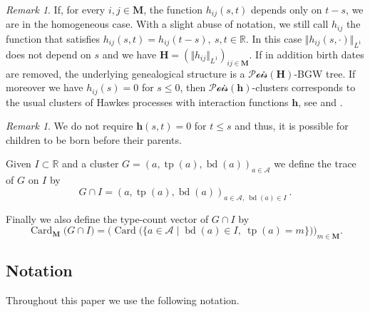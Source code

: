 \documentclass[reqno,final,11pt]{amsart}
\renewcommand{\cite}{\citet}
\theoremstyle{plain}
\theoremstyle{definition}
\theoremstyle{remark}
\newtheorem{remark}[theorem]{Remark}
\newcommand{\R}{\mathds{R}}
\newcommand{\M}{\bm{M}}
\newcommand{\A}{\mathcal{A}}
\newcommand{\h}{\bm{h}}
\renewcommand{\H}{\bm{H}}
\newcommand{\Vone}[1]{\Vert #1 \Vert_{L^1}}
\newcommand{\Pois}{\mathscr{P}\!\mathscr{o}\!\mathscr{i}\!\mathscr{s}}
\DeclareMathOperator{\card}{Card}
\DeclareMathOperator{\tp}{tp}
\DeclareMathOperator{\bd}{bd}
\begin{document}
\begin{remark}
	If, for every $i,j\in\M$, the function $h_{ij}(s,t)$ depends only on $t-s$, we are in the homogeneous case. With a slight abuse of notation, we still call $h_{ij}$ the function that satisfies $h_{ij}(s,t) = h_{ij}(t-s), \ s,t\in\R$. In this case $\Vone{h_{ij}(s,\cdot)}$ does not depend on $s$ and we have $\H = (\Vone{h_{ij}})_{ij\in\M}$. If in addition birth dates are removed, the underlying genealogical structure is a $\Pois(\H)$-BGW tree. If moreover we have $h_{ij}(s) = 0$ for $s \leq 0$, then $\Pois(\h)$-clusters corresponds to the usual clusters of Hawkes processes with interaction functions $\h$, see \cite{hawkes_spectra_1971} and \cite{hawkes_cluster_1974}.
\end{remark}
\begin{remark}
	We do not require $\h(s,t) =0$ for $t\leq s$ and thus, it is possible for children to be born before their parents.
\end{remark}

Given $I\subset \R$ and a cluster $G=(a,\tp(a),\bd(a))_{a\in\A}$ we define the trace of $G$ on $I$ by
\begin{equation*}
    G\cap I = (a,\tp(a),\bd(a))_{a\in\A, \ \bd(a)\in I} \ .
\end{equation*}

Finally we also define the type-count vector of $G\cap I$ by
\begin{equation*}
    \card_{\M}\big(G\cap I\big) = \Big(\card\big( \{ a\in\A \mid \bd(a)\in I, \ \tp(a)=m\}\big)\Big)_{m\in\M}.
\end{equation*}

\subsection{Notation}

Throughout this paper we use the following notation.
\end{document}
